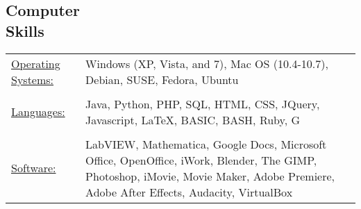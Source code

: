 \documentclass[margin]{res}
\begin{document}
\begin{resume}
\section{Computer \\ Skills}
\begin{tabular}{l p{3in}} %
  \underline{Operating Systems:} & Windows (XP, Vista, and 7), Mac OS (10.4-10.7), Debian, SUSE, Fedora, Ubuntu\\ \\
  \underline{Languages:} & Java, Python, PHP, SQL, HTML, CSS, JQuery, Javascript, \LaTeX, BASIC, BASH, Ruby, G\\ \\
  \underline{Software:} & LabVIEW, Mathematica, Google Docs, Microsoft Office, OpenOffice, iWork, Blender, The GIMP, Photoshop, iMovie, Movie Maker, Adobe Premiere, Adobe After Effects, Audacity, VirtualBox\\
\end{tabular}


\end{resume}
\end{document}
